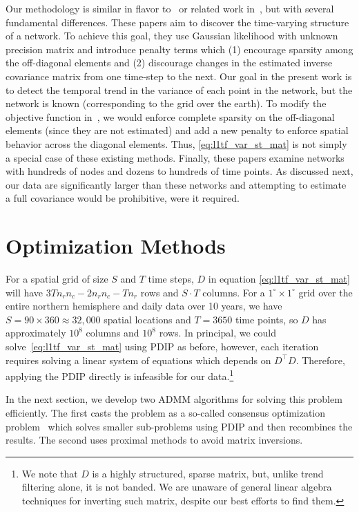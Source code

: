 \documentclass[letterpaper]{article} %
\newcommand{\citep}{\cite}
\begin{document}
Our methodology is similar in flavor to~\cite{HallacPark2017} or
related work in~\citep{GibberdNelson2017,MontiHellyer2014}, but with
several fundamental differences. These papers aim to
discover the time-varying structure of a network. To achieve this
goal, they use Gaussian likelihood with unknown precision matrix and
introduce penalty terms which (1) encourage sparsity among the
off-diagonal elements and (2) discourage changes in the estimated inverse
covariance matrix from one time-step to the next.
Our goal in the present work is to detect the temporal trend in the variance of each
point in the network, but the network is known (corresponding to the grid
over the earth). To modify the
objective function in~\cite[Eq.\ 2]{HallacPark2017}, we would
enforce complete sparsity on the off-diagonal elements (since
they are not estimated) and add a new penalty to enforce spatial
behavior across the diagonal elements. Thus, 
\eqref{eq:l1tf_var_st_mat} is not simply a special case of these
existing methods. Finally, these papers examine networks with hundreds
of nodes and dozens to hundreds of time points. As discussed next, our data are
significantly larger than these networks and attempting to estimate a
full covariance would be prohibitive, were it required.


\section{Optimization Methods}
\label{sec:prop-optim-meth}

For a spatial grid of size $S$ and $T$ time steps, $D$ in equation \ref{eq:l1tf_var_st_mat} will have
$3Tn_rn_c-2n_rn_c-Tn_r$ rows and $S \cdot T$ columns. For a $1^\circ\times
1^\circ$ grid over the entire northern hemisphere and daily data over
10 years, we have $S=90\times 360\approx 32,000$ spatial locations and
$T=3650$ time points, so $D$ has
approximately $10^8$ columns and $10^8$ rows. In principal, we could
solve~\eqref{eq:l1tf_var_st_mat} using PDIP as before, however, each iteration
requires solving a linear system of equations which
depends on $D^\top D$. Therefore,
applying the PDIP directly is infeasible for our data.\footnote{We
  note that $D$ is a highly structured, sparse matrix, but, unlike
  trend filtering alone, it is not banded. We are unaware of general
  linear algebra techniques for inverting such matrix, despite our
  best efforts to find them.}  

In the next section, we develop two ADMM algorithms for solving this
problem efficiently. The first casts the problem as a
so-called consensus optimization problem~\cite{boyd_distributed_2011}
which solves smaller sub-problems using PDIP and then recombines the results. The
second uses proximal methods to avoid matrix inversions.
 
\end{document}
